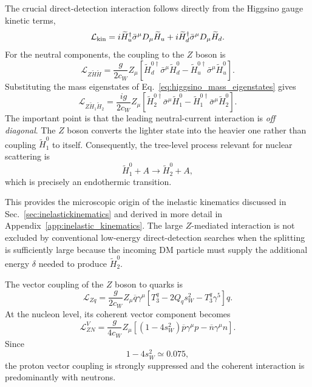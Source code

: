 \documentclass[aps,prd,reprint,superscriptaddress,nofootinbib,longbibliography,floatfix]{revtex4-2}
\begin{document}
The crucial direct-detection interaction follows directly from the Higgsino gauge kinetic terms,
\begin{equation}
\mathcal{L}_{\rm kin}
=
i\widetilde H_u^\dagger
\bar\sigma^\mu D_\mu\widetilde H_u
+
i\widetilde H_d^\dagger
\bar\sigma^\mu D_\mu\widetilde H_d.
\end{equation}
For the neutral components, the coupling to the $Z$ boson is
\begin{equation}
\mathcal{L}_{Z\widetilde H\widetilde H}
=
\frac{g}{2c_W}
Z_\mu
\left[
\widetilde H_d^{0\dagger}
\bar\sigma^\mu
\widetilde H_d^0
-
\widetilde H_u^{0\dagger}
\bar\sigma^\mu
\widetilde H_u^0
\right].
\label{eq:higgsino_Z_gauge}
\end{equation}
Substituting the mass eigenstates of Eq.~\eqref{eq:higgsino_mass_eigenstates} gives
\begin{equation}
\mathcal{L}_{Z\widetilde H_1\widetilde H_2}
=
\frac{ig}{2c_W}
Z_\mu
\left[
\widetilde H_2^{0\dagger}
\bar\sigma^\mu
\widetilde H_1^0
-
\widetilde H_1^{0\dagger}
\bar\sigma^\mu
\widetilde H_2^0
\right].
\label{eq:higgsino_Z_offdiagonal}
\end{equation}
The important point is that the leading neutral-current interaction is \emph{off diagonal}. The $Z$ boson converts the lighter state into the heavier one rather than coupling $\widetilde H_1^0$ to itself. Consequently, the tree-level process relevant for nuclear scattering is
\begin{equation}
\widetilde H_1^0+A
\rightarrow
\widetilde H_2^0+A,
\label{eq:higgsino_inelastic_process}
\end{equation}
which is precisely an endothermic transition.

This provides the microscopic origin of the inelastic kinematics discussed in Sec.~\ref{sec:inelastickinematics} and derived in more detail in Appendix~\ref{app:inelastic_kinematics}. The large $Z$-mediated interaction is not excluded by conventional low-energy direct-detection searches when the splitting is sufficiently large because the incoming DM particle must supply the additional energy $\delta$ needed to produce $\widetilde H_2^0$.

The vector coupling of the $Z$ boson to quarks is
\begin{equation}
\mathcal{L}_{Zq}
=
\frac{g}{2c_W}
Z_\mu
\overline q\gamma^\mu
\left[
T_3^q
-
2Q_qs_W^2
-
T_3^q\gamma^5
\right]q.
\end{equation}
At the nucleon level, its coherent vector component becomes
\begin{equation}
\mathcal{L}_{ZN}^{V}
=
\frac{g}{4c_W}
Z_\mu
\left[
\left(
1-4s_W^2
\right)
\overline p\gamma^\mu p
-
\overline n\gamma^\mu n
\right].
\label{eq:Z_nucleon_vector}
\end{equation}
Since
\begin{equation}
1-4s_W^2\simeq0.075,
\end{equation}
the proton vector coupling is strongly suppressed and the coherent interaction is predominantly with neutrons.
\end{document}
